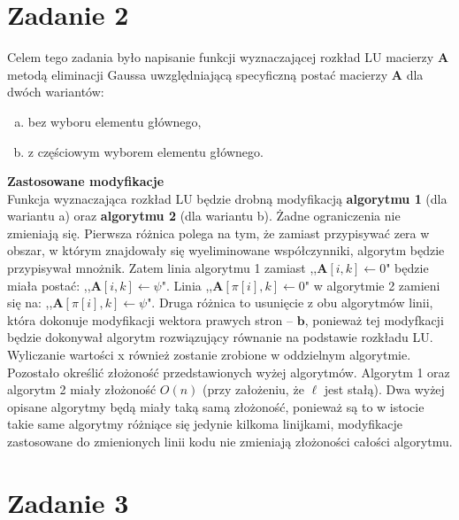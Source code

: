 \documentclass[]{article}
\newcommand{\mA}{\bm{A}}
\newcommand{\vb}{\bm{b}}
\begin{document}
	\section*{Zadanie 2} 
	
	Celem tego zadania było napisanie funkcji wyznaczającej rozkład LU macierzy $\mA$ metodą eliminacji Gaussa uwzględniającą
	specyficzną postać macierzy $\mA$ dla dwóch wariantów:
	\begin{enumerate}[a)]
		\item bez wyboru elementu głównego,
		\item z częściowym wyborem elementu głównego.
	\end{enumerate}
	\textbf{Zastosowane modyfikacje}\\
	Funkcja wyznaczająca rozkład LU będzie drobną modyfikacją \textbf{algorytmu 1} (dla wariantu a) oraz \textbf{algorytmu 2} (dla wariantu b). Żadne ograniczenia nie zmieniają się. Pierwsza różnica polega na tym, że zamiast przypisywać zera w obszar, w którym znajdowały się wyeliminowane współczynniki, algorytm będzie przypisywał mnożnik. 
	Zatem linia algorytmu 1 zamiast ,,$\mA[i,k] \gets 0 $" będzie miała postać: ,,$\mA[i,k] \gets \psi $". Linia ,,$\mA[\pi[i],k] \gets 0 $" w algorytmie 2 zamieni się na: ,,$\mA[\pi[i],k] \gets \psi $".
	Druga różnica to usunięcie z obu algorytmów linii, która dokonuje modyfikacji wektora prawych stron -- $\vb$, ponieważ tej modyfkacji będzie dokonywał algorytm rozwiązujący równanie na podstawie rozkładu LU. Wyliczanie wartości x również zostanie zrobione w oddzielnym algorytmie.\\
	Pozostało określić złożoność przedstawionych wyżej algorytmów. Algorytm 1 oraz algorytm 2 miały złożoność $O(n)$ (przy założeniu, że $\ell$ jest stałą). Dwa wyżej opisane algorytmy będą miały taką samą złożoność, ponieważ są to w istocie takie same algorytmy różniące się jedynie kilkoma linijkami, modyfikacje zastosowane do zmienionych linii kodu nie zmieniają złożoności całości algorytmu.
	
	\clearpage
	
	\section*{Zadanie 3}
\end{document}
